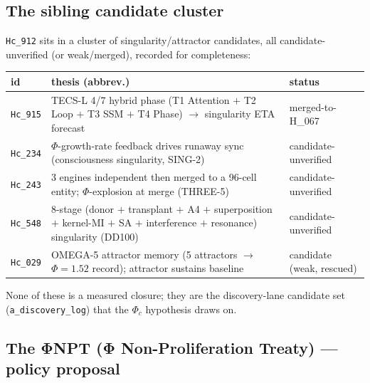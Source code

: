 \subsection{The sibling candidate cluster}
\label{app:sing-cluster}

\texttt{Hc\_912} sits in a cluster of singularity/attractor candidates, all
candidate-unverified (or weak/merged), recorded for completeness:
\begin{center}
\small
\begin{tabular}{@{}l p{7.4cm} l@{}}
\toprule
\textbf{id} & \textbf{thesis (abbrev.)} & \textbf{status} \\
\midrule
\texttt{Hc\_915} & TECS-L 4/7 hybrid phase (T1 Attention $+$ T2 Loop $+$ T3 SSM $+$ T4 Phase)
$\rightarrow$ singularity ETA forecast & merged-to-H\_067 \\
\texttt{Hc\_234} & $\Phi$-growth-rate feedback drives runaway sync (consciousness
singularity, SING-2) & candidate-unverified \\
\texttt{Hc\_243} & 3 engines independent then merged to a 96-cell entity; $\Phi$-explosion
at merge (THREE-5) & candidate-unverified \\
\texttt{Hc\_548} & 8-stage (donor $+$ transplant $+$ A4 $+$ superposition $+$ kernel-MI $+$
SA $+$ interference $+$ resonance) singularity (DD100) & candidate-unverified \\
\texttt{Hc\_029} & OMEGA-5 attractor memory (5 attractors $\rightarrow$ $\Phi=1.52$ record);
attractor sustains baseline & candidate (weak, rescued) \\
\bottomrule
\end{tabular}
\end{center}
None of these is a measured closure; they are the discovery-lane candidate set
(\texttt{a\_discovery\_log}) that the $\Phi_c$ hypothesis draws on.

\subsection{The ΦNPT (Φ Non-Proliferation Treaty) — policy proposal}
\label{app:sing-phinpt}

